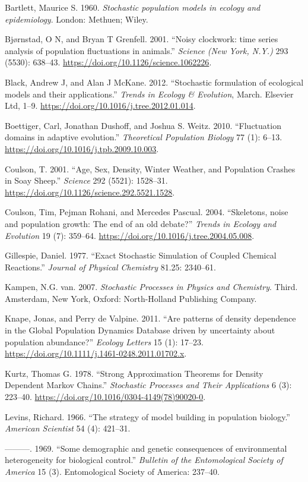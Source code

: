 \documentclass[3p]{elsarticle} %
\begin{document}
\hypertarget{refs}{}
\leavevmode\hypertarget{ref-Bartlett1960}{}%
Bartlett, Maurice S. 1960. \emph{Stochastic population models in ecology
and epidemiology}. London: Methuen; Wiley.

\leavevmode\hypertarget{ref-Bjornstad2001}{}%
Bjørnstad, O N, and Bryan T Grenfell. 2001. ``Noisy clockwork: time
series analysis of population fluctuations in animals.'' \emph{Science
(New York, N.Y.)} 293 (5530): 638--43.
\url{https://doi.org/10.1126/science.1062226}.

\leavevmode\hypertarget{ref-Black2012}{}%
Black, Andrew J, and Alan J McKane. 2012. ``Stochastic formulation of
ecological models and their applications.'' \emph{Trends in Ecology \&
Evolution}, March. Elsevier Ltd, 1--9.
\url{https://doi.org/10.1016/j.tree.2012.01.014}.

\leavevmode\hypertarget{ref-Boettiger2010}{}%
Boettiger, Carl, Jonathan Dushoff, and Joshua S. Weitz. 2010.
``Fluctuation domains in adaptive evolution.'' \emph{Theoretical
Population Biology} 77 (1): 6--13.
\url{https://doi.org/10.1016/j.tpb.2009.10.003}.

\leavevmode\hypertarget{ref-Coulson2001}{}%
Coulson, T. 2001. ``Age, Sex, Density, Winter Weather, and Population
Crashes in Soay Sheep.'' \emph{Science} 292 (5521): 1528--31.
\url{https://doi.org/10.1126/science.292.5521.1528}.

\leavevmode\hypertarget{ref-Coulson2004}{}%
Coulson, Tim, Pejman Rohani, and Mercedes Pascual. 2004. ``Skeletons,
noise and population growth: The end of an old debate?'' \emph{Trends in
Ecology and Evolution} 19 (7): 359--64.
\url{https://doi.org/10.1016/j.tree.2004.05.008}.

\leavevmode\hypertarget{ref-Gillespie1977}{}%
Gillespie, Daniel. 1977. ``Exact Stochastic Simulation of Coupled
Chemical Reactions.'' \emph{Journal of Physical Chemistry} 81.25:
2340--61.

\leavevmode\hypertarget{ref-vanKampen2007}{}%
Kampen, N.G. van. 2007. \emph{Stochastic Processes in Physics and
Chemistry}. Third. Amsterdam, New York, Oxford: North-Holland Publishing
Company.

\leavevmode\hypertarget{ref-Knape2011}{}%
Knape, Jonas, and Perry de Valpine. 2011. ``Are patterns of density
dependence in the Global Population Dynamics Database driven by
uncertainty about population abundance?'' \emph{Ecology Letters} 15 (1):
17--23. \url{https://doi.org/10.1111/j.1461-0248.2011.01702.x}.

\leavevmode\hypertarget{ref-Kurtz1978}{}%
Kurtz, Thomas G. 1978. ``Strong Approximation Theorems for Density
Dependent Markov Chains.'' \emph{Stochastic Processes and Their
Applications} 6 (3): 223--40.
\url{https://doi.org/10.1016/0304-4149(78)90020-0}.

\leavevmode\hypertarget{ref-Levins1966}{}%
Levins, Richard. 1966. ``The strategy of model building in population
biology.'' \emph{American Scientist} 54 (4): 421--31.

\leavevmode\hypertarget{ref-Levins1969}{}%
---------. 1969. ``Some demographic and genetic consequences of
environmental heterogeneity for biological control.'' \emph{Bulletin of
the Entomological Society of America} 15 (3). Entomological Society of
America: 237--40.
\end{document}
